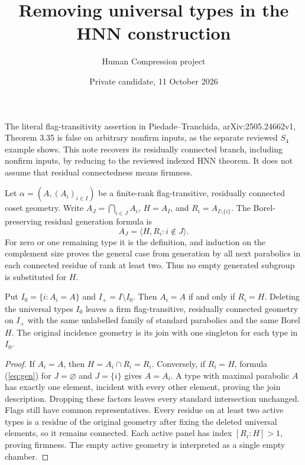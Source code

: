 
\title{Removing universal types in the HNN construction}
\author{Human Compression project}
\date{Private candidate, 11 October 2026}
\maketitle
The literal flag-transitivity assertion in Piedade--Tranchida,
arXiv:2505.24662v1, Theorem 3.35 is false on arbitrary nonfirm inputs,
as the separate reviewed $S_4$ example shows. This note recovers its
residually connected branch, including nonfirm inputs, by reducing to
the reviewed indexed HNN theorem. It does not assume that residual
connectedness means firmness.

Let $\alpha=(A,(A_i)_{i\in I})$ be a finite-rank flag-transitive,
residually connected coset geometry. Write $A_J=\bigcap_{i\in J}A_i$,
$H=A_I$, and $R_i=A_{I\setminus\{i\}}$.
The Borel-preserving residual generation formula is
\begin{equation}\label{eq:gen}
 A_J=\langle H,R_i:i\notin J\rangle.
\end{equation}
For zero or one remaining type it is the definition, and induction
on the complement size proves the general case from generation by
all next parabolics in each connected residue of rank at least two.
Thus no empty generated subgroup is substituted for $H$.

\begin{lemma}\label{lem:active}
Put $I_0=\{i:A_i=A\}$ and $I_+=I\setminus I_0$.
Then $A_i=A$ if and only if $R_i=H$. Deleting the universal types
$I_0$ leaves a firm flag-transitive, residually connected geometry
on $I_+$ with the same unlabelled family of standard parabolics and
the same Borel $H$. The original incidence geometry is its join
with one singleton for each type in $I_0$.
\end{lemma}
\begin{proof}
If $A_i=A$, then $H=A_i\cap R_i=R_i$. Conversely, if $R_i=H$,
formula (\ref{eq:gen}) for $J=\varnothing$ and $J=\{i\}$ gives
$A=A_i$. A type with maximal parabolic $A$ has exactly one element,
incident with every other element, proving the join description.
Dropping these factors leaves every standard intersection unchanged.
Flags still have common representatives. Every residue on at least
two active types is a residue of the original geometry after fixing
the deleted universal elements, so it remains connected. Each active
panel has index $[R_i:H]>1$, proving firmness. The empty active
geometry is interpreted as a single empty chamber.
\end{proof}

